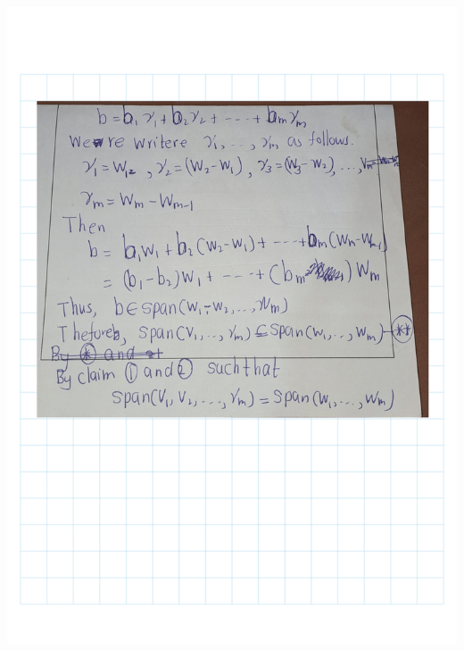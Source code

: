 \documentclass[
]{book}
\theoremstyle{definition}
\theoremstyle{definition}
\theoremstyle{definition}
\theoremstyle{definition}
\theoremstyle{remark}
\begin{document}
\includegraphics{fig/Ex2A/Ex2A-04.png}
\end{document}
